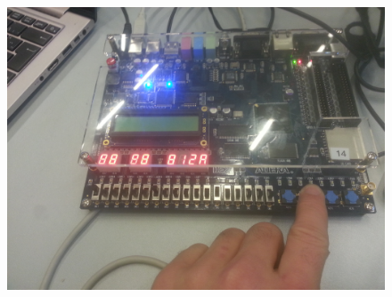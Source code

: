 \begin{enumerate}
\begin{figure}[h]
			\includegraphics[scale=0.8]{pictures/Oevelse5/opg3/guess_2p_show.JPG}
			\caption{}
			\label{fig:Guess2pShow}
		\end{figure}
\end{enumerate}